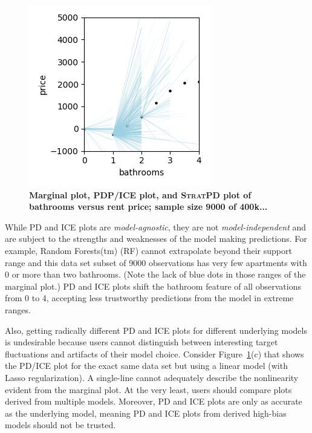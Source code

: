 \documentclass[12pt]{article}
\newcommand{\figref}[1]{Figure~\ref{#1}}
\newcommand{\cut}[1]{}
\newcommand{\spd}{\fontfamily{cmr}\textsc{\small StratPD}}
\begin{document}
\begin{figure}[htbp]
\begin{center}
\includegraphics[scale=0.7]{images/bathrooms_vs_price_stratpd.png}
\caption{{\bf  Marginal plot, PDP/ICE plot, and \spd{} plot of bathrooms versus rent price; sample size 9000 of 400k...}}
\label{fig:baths_price}
\end{center}
\end{figure}

\cut{The partial dependence plot broadly follows the marginal plot except for the prices of two and three bathroom apartments, where it levels off. This is counterintuitive and exposes an issue with PD and ICE plots.} While PD and ICE plots are {\em model-agnostic}, they are not {\em model-independent} and are subject to the strengths and weaknesses of the model making predictions.  For example, Random Forests(tm) (RF) cannot extrapolate beyond their support range and this data set subset of 9000 observations has very few apartments with 0 or more than two bathrooms.  (Note the lack of blue dots in those ranges of the marginal plot.) PD and ICE plots shift the bathroom feature of all observations from 0 to 4, accepting less trustworthy predictions from the model in extreme ranges.   

Also, getting radically different PD and ICE plots for different underlying models is undesirable because users cannot distinguish between interesting target fluctuations and artifacts of their model choice. Consider \figref{fig:baths_price}(c) that shows the PD/ICE plot for the exact same data set but using a linear model (with Lasso regularization). A single-line cannot adequately describe the nonlinearity evident from the marginal plot. At the very least, users should compare plots derived from multiple models. Moreover, PD and ICE plots are only as accurate as the underlying model, meaning PD and ICE plots from derived high-bias models should not be trusted.
\end{document}
